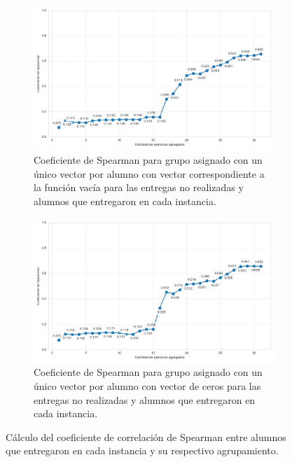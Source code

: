\documentclass[11pt,a4paper,twoside,openany]{tesis}
\begin{document}
\begin{figure}[H]
    \centering
    \begin{subfigure}[t]{0.45\textwidth}
        \includegraphics[width=\linewidth]{imagenes/spearman_evolution.png}
        \caption{Coeficiente de Spearman para grupo asignado con un único vector por alumno con vector correspondiente a la función vacía para las entregas no realizadas y alumnos que entregaron en cada instancia.}
        \label{spearman_data}
    \end{subfigure}
   \hspace{0.05\textwidth}
    \hfill
    \begin{subfigure}[t]{0.45\textwidth}
        \includegraphics[width=\linewidth]{imagenes/spearman_evolution_zeros.png}
        \caption{Coeficiente de Spearman para grupo asignado con un único vector por alumno con vector de ceros para las entregas no realizadas y alumnos que entregaron en cada instancia.}
        \label{spearman_zeros}
    \end{subfigure}
    \caption{Cálculo del coeficiente de correlación de Spearman entre alumnos que entregaron en cada instancia y su respectivo agrupamiento.}
    \label{spearman}
\end{figure} 
\end{document}
